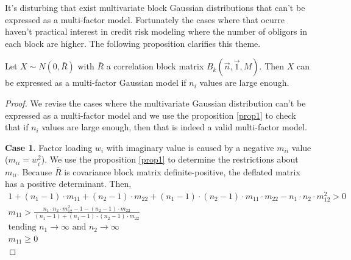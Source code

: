 \documentclass[11pt,fleqn]{book} %
\begin{document}
It's disturbing that exist multivariate block Gaussian distributions 
that can't be expressed as a multi-factor model. Fortunately the 
cases where that ocurre haven't practical interest in credit risk
modeling where the number of obligors in each block are higher. 
The following proposition clarifies this theme.

\begin{proposition}
	\label{prop:gmfamgb}
	Let $X \sim N(0,\bar{R})$ with $\bar{R}$ a correlation block matrix 
	$B_k(\vec{n},\vec{1},M)$. Then $X$ can be expressed as a multi-factor 
	Gaussian model if $n_i$ values are large enough.
\end{proposition}
\begin{proof}
	We revise the cases where the multivariate Gaussian distribution can't
	be expressed as a multi-factor model and we use the proposition 
	\ref{prop1} to check that if $n_i$ values are large enough, then 
	that is indeed a valid multi-factor model.
	
	\textbf{Case 1}. Factor loading $w_i$ with imaginary value is caused by 
	a negative $m_{ii}$ value ($m_{ii} = w_i^2$). We use the proposition 
	\ref{prop1} to determine the restrictions about $m_{ii}$. Because 
	$\bar{R}$ is covariance block matrix definite-positive, the deflated 
	matrix has a positive determinant. Then,
	\begin{displaymath}
		\begin{array}{l}
			1 + (n_1-1) \cdot m_{11} + (n_2-1) \cdot m_{22} +                     
			(n_1-1) \cdot (n_2-1) \cdot m_{11} \cdot m_{22} -                     
			n_1 \cdot n_2 \cdot m_{12}^2 > 0                                      
			                                                                      \\
			m_{11} > \frac{n_1 \cdot n_2 \cdot m_{12}^2 -1 -(n_2-1) \cdot m_{22}} 
			{(n_1-1) + (n_1-1) \cdot (n_2-1) \cdot m_{22}}                        
			                                                                      \\
			\text{tending } n_1 \to \infty \text{ and } n_2 \to \infty
			                                                                      \\
			m_{11} \ge 0                                                          
		\end{array}
	\end{displaymath}
	

\end{proof}
\end{document}
